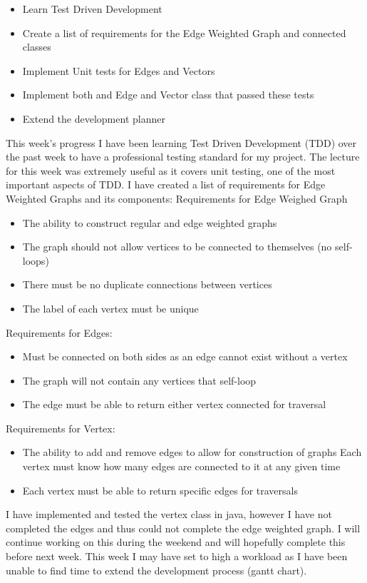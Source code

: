 \documentclass{AISB2008}
\begin{document}
{\begin{itemize}
\item	Learn Test Driven Development
\item	Create a list of requirements for the Edge Weighted Graph and connected classes
\item	Implement Unit tests for Edges and Vectors
\item	Implement both and Edge and Vector class that passed these tests
\item	Extend the development planner
\end{itemize}
This week’s progress
I have been learning Test Driven Development (TDD) over the past week to have a professional testing standard for my project. The lecture for this week was extremely useful as it covers unit testing, one of the most important aspects of TDD.
I have created a list of requirements for Edge Weighted Graphs and its components:
Requirements for Edge Weighed Graph

\begin{itemize}
\item	The ability to construct regular and edge weighted graphs
\item	The graph should not allow vertices to be connected to themselves (no self-loops)
\item	There must be no duplicate connections between vertices
\item	The label of each vertex must be unique
\end{itemize}
Requirements for Edges:

\begin{itemize}
\item	Must be connected on both sides as an edge cannot exist without a vertex
\item	The graph will not contain any vertices that self-loop
\item	The edge must be able to return either vertex connected for traversal
\end{itemize}
Requirements for Vertex:

\begin{itemize}
\item	The ability to add and remove edges to allow for construction of graphs
Each vertex must know how many edges are connected to it at any given time
\item	Each vertex must be able to return specific edges for traversals
\end{itemize}
I have implemented and tested the vertex class in java, however I have not completed the edges and thus could not complete the edge weighted graph. I will continue working on this during the weekend and will hopefully complete this before next week.
This week I may have set to high a workload as I have been unable to find time to extend the development process (gantt chart).\\


}
\end{document}

